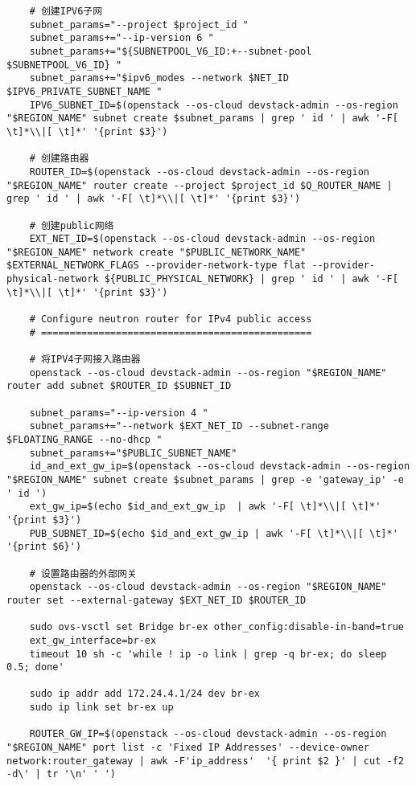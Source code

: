 \documentclass[a4paper,left=1.5cm,right=1.5cm,11pt]{article}
\begin{document}
\begin{lstlisting}
	# 创建IPV6子网
	subnet_params="--project $project_id "
	subnet_params+="--ip-version 6 "
	subnet_params+="${SUBNETPOOL_V6_ID:+--subnet-pool $SUBNETPOOL_V6_ID} "
    subnet_params+="$ipv6_modes --network $NET_ID $IPV6_PRIVATE_SUBNET_NAME "
	IPV6_SUBNET_ID=$(openstack --os-cloud devstack-admin --os-region "$REGION_NAME" subnet create $subnet_params | grep ' id ' | awk '-F[ \t]*\\|[ \t]*' '{print $3}')

	# 创建路由器
	ROUTER_ID=$(openstack --os-cloud devstack-admin --os-region "$REGION_NAME" router create --project $project_id $Q_ROUTER_NAME | grep ' id ' | awk '-F[ \t]*\\|[ \t]*' '{print $3}')

	# 创建public网络
	EXT_NET_ID=$(openstack --os-cloud devstack-admin --os-region "$REGION_NAME" network create "$PUBLIC_NETWORK_NAME" $EXTERNAL_NETWORK_FLAGS --provider-network-type flat --provider-physical-network ${PUBLIC_PHYSICAL_NETWORK} | grep ' id ' | awk '-F[ \t]*\\|[ \t]*' '{print $3}')

	# Configure neutron router for IPv4 public access
	# ===============================================

	# 将IPV4子网接入路由器
	openstack --os-cloud devstack-admin --os-region "$REGION_NAME" router add subnet $ROUTER_ID $SUBNET_ID

	subnet_params="--ip-version 4 "
	subnet_params+="--network $EXT_NET_ID --subnet-range $FLOATING_RANGE --no-dhcp "
    subnet_params+="$PUBLIC_SUBNET_NAME"
	id_and_ext_gw_ip=$(openstack --os-cloud devstack-admin --os-region "$REGION_NAME" subnet create $subnet_params | grep -e 'gateway_ip' -e ' id ')
	ext_gw_ip=$(echo $id_and_ext_gw_ip  | awk '-F[ \t]*\\|[ \t]*' '{print $3}')
    PUB_SUBNET_ID=$(echo $id_and_ext_gw_ip | awk '-F[ \t]*\\|[ \t]*' '{print $6}')

	# 设置路由器的外部网关
	openstack --os-cloud devstack-admin --os-region "$REGION_NAME" router set --external-gateway $EXT_NET_ID $ROUTER_ID

	sudo ovs-vsctl set Bridge br-ex other_config:disable-in-band=true
	ext_gw_interface=br-ex
	timeout 10 sh -c 'while ! ip -o link | grep -q br-ex; do sleep 0.5; done'

	sudo ip addr add 172.24.4.1/24 dev br-ex
    sudo ip link set br-ex up

	ROUTER_GW_IP=$(openstack --os-cloud devstack-admin --os-region "$REGION_NAME" port list -c 'Fixed IP Addresses' --device-owner network:router_gateway | awk -F'ip_address'  '{ print $2 }' | cut -f2 -d\' | tr '\n' ' ')


\end{lstlisting}
\end{document}
